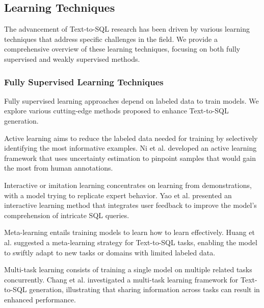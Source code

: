 \subsection{Learning Techniques}

The advancement of Text-to-SQL research has been driven by various learning techniques that address specific challenges in the field. We provide a comprehensive overview of these learning techniques, focusing on both fully supervised and weakly supervised methods.

\subsubsection{Fully Supervised Learning Techniques}

Fully supervised learning approaches depend on labeled data to train models. We explore various cutting-edge methods proposed to enhance Text-to-SQL generation.


Active learning aims to reduce the labeled data needed for training by selectively identifying the most informative examples. Ni et al.\cite{ni2019merging} developed an active learning framework that uses uncertainty estimation to pinpoint samples that would gain the most from human annotations.


Interactive or imitation learning concentrates on learning from demonstrations, with a model trying to replicate expert behavior. Yao et al. \cite{yao-etal-2019-model} presented an interactive learning method that integrates user feedback to improve the model's comprehension of intricate SQL queries.


Meta-learning entails training models to learn how to learn effectively. Huang et al. \cite{huang-etal-2018-natural} suggested a meta-learning strategy for Text-to-SQL tasks, enabling the model to swiftly adapt to new tasks or domains with limited labeled data.


Multi-task learning consists of training a single model on multiple related tasks concurrently. Chang et al. \cite{chen2021leveraging} investigated a multi-task learning framework for Text-to-SQL generation, illustrating that sharing information across tasks can result in enhanced performance.

